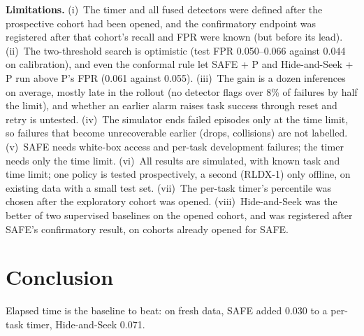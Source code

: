 \documentclass[10pt,a4paper,twocolumn]{article}
\begin{document}
\textbf{Limitations.} (i)~The timer and all fused detectors were defined after the
prospective cohort had been opened, and the confirmatory endpoint was registered after that
cohort's recall and FPR were known (but before its lead). (ii)~The two-threshold search is
optimistic (test FPR 0.050--0.066 against 0.044 on calibration), and even the conformal rule
let SAFE + P and Hide-and-Seek + P run above P's FPR (0.061 against 0.055).
(iii)~The gain is a dozen inferences on average, mostly late in the rollout (no detector flags
over 8\% of failures by half the limit), and whether an
earlier alarm raises task success through reset and retry is untested. (iv)~The simulator
ends failed episodes only at the time limit, so failures that become unrecoverable earlier
(drops, collisions) are not labelled. (v)~SAFE needs white-box access and per-task
development failures; the timer needs only the time limit. (vi)~All results are simulated, with
known task and time limit; one policy is tested prospectively, a second (RLDX-1) only
offline, on existing data with a small test set. (vii)~The per-task timer's percentile was chosen after the
exploratory cohort was opened. (viii)~Hide-and-Seek was the better of two supervised baselines
on the opened cohort, and was registered after SAFE's confirmatory result, on cohorts already
opened for SAFE.

\section{Conclusion}

Elapsed time is the baseline to beat: on fresh data, SAFE added 0.030 to a per-task timer,
Hide-and-Seek 0.071.

\clearpage



\end{document}

